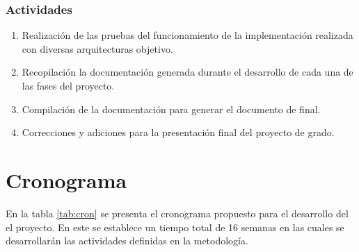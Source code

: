 \documentclass[12pt]{article}
\begin{document}
    \subsubsection*{Actividades}
    
   \begin{enumerate}[label=\thesubsection.\arabic*., wide, labelindent=2em, leftmargin=5em]
        \item Realización de las pruebas del funcionamiento de la implementación realizada con diversas arquitecturas objetivo.
        \item Recopilación la documentación generada durante el desarrollo de cada una de las fases del proyecto.
        \item Compilación de la documentación para generar el documento de final.
        \item Correcciones y adiciones para la presentación final del proyecto de grado.
    \end{enumerate}  


    \section{Cronograma}

    En la tabla \ref{tab:cron} se presenta el cronograma propuesto para el desarrollo del el proyecto. En este se establece un tiempo total de 16 semanas en las cuales se desarrollarán las actividades definidas en la metodología.
\end{document}
